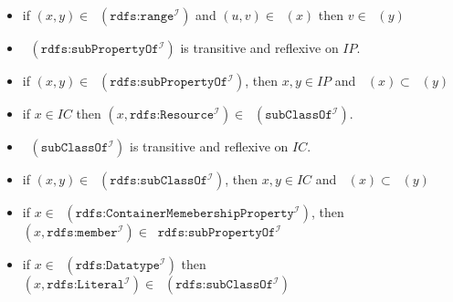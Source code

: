 \documentclass{article}
\DeclareMathOperator{\IEXT}{I_{EXT}}
\DeclareMathOperator{\ICEXT}{I_{CEXT}}
\newcommand{\deno}[1]{{\texttt{#1}}^{\mathcal{I}}}
\begin{document}
\begin{defin}
\begin{itemize}
\item if $(x,y) \in \IEXT(\deno{rdfs:range})$ and $(u,v) \in \IEXT(x)$ then $v \in \ICEXT(y)$ 

\item $\IEXT(\deno{rdfs:subPropertyOf})$ is transitive and reflexive on $IP$. 
\item if $(x,y) \in \IEXT(\deno{rdfs:subPropertyOf})$, then $x,y \in IP$ and $\IEXT(x) \subset \IEXT(y)$

\item if $x \in IC$ then $(x,\deno{rdfs:Resource})\in \IEXT(\deno{subClassOf})$. 

\item $\IEXT(\deno{subClassOf})$ is transitive and reflexive on $IC$.

\item if $(x,y) \in \IEXT(\deno{rdfs:subClassOf})$, then $x,y \in IC$ and $\ICEXT(x) \subset \ICEXT(y)$

\item if $x \in \ICEXT(\deno{rdfs:ContainerMemebershipProperty})$, then $(x,\deno{rdfs:member}) \in \IEXT{\deno{rdfs:subPropertyOf}}$

\item if $x \in \ICEXT(\deno{rdfs:Datatype})$ then $(x,\deno{rdfs:Literal}) \in \IEXT(\deno{rdfs:subClassOf})$ 


\end{itemize}
\end{defin}
\end{document}
